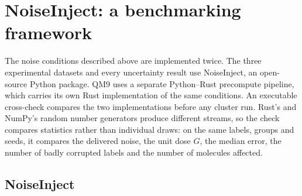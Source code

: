 \section{NoiseInject: a benchmarking framework}

The noise conditions described above are implemented twice. The three experimental datasets and
every uncertainty result use NoiseInject, an open-source Python package. QM9 uses a separate
Python--Rust precompute pipeline, which carries its own Rust implementation of the same conditions.
An executable cross-check compares the two implementations before any cluster run. Rust's and
NumPy's random number generators produce different streams, so the check compares statistics rather
than individual draws: on the same labels, groups and seeds, it compares the delivered noise, the
unit dose $G$, the median error, the number of badly corrupted labels and the number of molecules
affected.

\subsection{NoiseInject}

